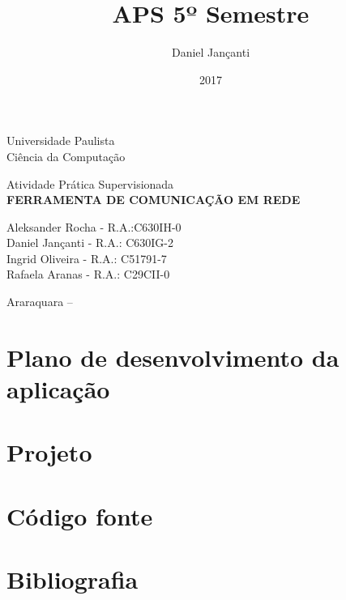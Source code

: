 \documentclass[12pt, a4paper]{article}
\title{APS 5º Semestre}
\author{Daniel Jançanti}
\date{2017}
\begin{document}
	\begin{center}
		\Huge Universidade Paulista\\
		\large Ciência da Computação
		
		\vfill
		
		\large Atividade Prática Supervisionada\\
		\textbf{\MakeUppercase{Ferramenta de comunicação em rede}}
		
		\bigskip
		\bigskip
		
		\normalsize{
			Aleksander Rocha - R.A.:C630IH-0\\
			Daniel Jançanti - R.A.: C630IG-2\\
			Ingrid Oliveira - R.A.: C51791-7\\
			Rafaela Aranas - R.A.: C29CII-0\\	
		}
		
		\vfill
		
		Araraquara -- \the\year
		
	\end{center}
	
	\thispagestyle{empty}
	
	\newpage
	\tableofcontents
	\thispagestyle{empty}

		
	
	
	
	
	
	\newpage
	\section{Plano de desenvolvimento da aplicação}
	\lipsum[1]
	
	\newpage
	\section{Projeto}
	\lipsum[1]
	
	\newpage
	\section{Código fonte}
	\lipsum[1]
	
	\newpage
	\section{Bibliografia}
	\lipsum[1]
	
	
	
	
	
	
	
	
	
\end{document}
